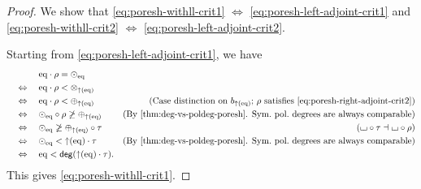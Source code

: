 \documentclass[a4paper]{memoir}
\begin{document}
\begin{proof}
	We show that \cref{eq:poresh-withll-crit1} $\Leftrightarrow$ \cref{eq:poresh-left-adjoint-crit1} and \cref{eq:poresh-withll-crit2} $\Leftrightarrow$ \cref{eq:poresh-left-adjoint-crit2}.
	
	Starting from \cref{eq:poresh-left-adjoint-crit1}, we have
	\begin{align*}
		&\quad\mathrel{\phantom{\Leftrightarrow}}\quad
		\eqtydeg \cdot \rho = \nonpol_\eqtydeg \\
		&\quad\Leftrightarrow\quad
		\eqtydeg \cdot \rho < \mixpol_{\sucdeg(\eqtydeg)} \\
		&\quad\Leftrightarrow\quad
		\eqtydeg \cdot \rho < \pospol_{\sucdeg(\eqtydeg)}
		& \text{(Case distinction on $b_{\sucdeg(\eqtydeg)}$; $\rho$ satisfies \cref{eq:poresh-right-adjoint-crit2})} \\
		&\quad\Leftrightarrow\quad
		\nonpol_\eqtydeg \circ \rho \not\geq \pospol_{\sucdeg(\eqtydeg)}
		& \text{(By \cref{thm:deg-vs-poldeg-poresh}. Sym.\ pol.\ degrees are always comparable)} \\
		&\quad\Leftrightarrow\quad
		\nonpol_\eqtydeg \not\geq \pospol_{\sucdeg(\eqtydeg)} \circ \tau
		& \text{($\loch \circ \tau \dashv \loch \circ \rho$)} \\
		&\quad\Leftrightarrow\quad
		\nonpol_\eqtydeg < {\sucdeg(\eqtydeg)} \cdot \tau
		& \text{(By \cref{thm:deg-vs-poldeg-poresh}. Sym.\ pol.\ degrees are always comparable)} \\
		&\quad\Leftrightarrow\quad
		\eqtydeg < \getdeg({\sucdeg(\eqtydeg)} \cdot \tau).
	\end{align*}
	This gives \cref{eq:poresh-withll-crit1}.
	

\end{proof}
\end{document}
